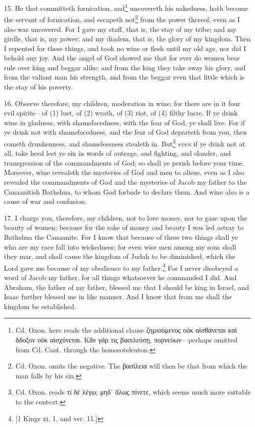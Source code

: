 15. He that committeth fornication, and\footnote{Cd. Oxon. here reads the additional clause \textgreek{ζημιούμενος οὐκ αἰσθάνεται καὶ ἄδοξον οὐκ αἰσχύνεται. Κἂν γάρ τις βασιλεύσῃ, πορνεύων}—perhaps omitted from Cd. Cant. through the homœoteleuton.} uncovereth his nakedness, hath become the servant of fornication, and escapeth not\footnote{Cd. Oxon. omits the negative. The \textgreek{βασίλεια} will then be that from which the man falls by his sin.} from the power thereof, even as I also was uncovered. For I gave my staff, that is, the stay of my tribe; and my girdle, that is, my power; and my diadem, that is, the glory of my kingdom. Then I repented for these things, and took no wine or flesh until my old age, nor did I behold any joy. And the angel of God showed me that for ever do women bear rule over king and beggar alike; and from the king they take away his glory, and from the valiant man his strength, and from the beggar even that little which is the stay of his poverty.

16. Observe therefore, my children, moderation in wine; for there are in it four evil spirits—of (1) lust, of (2) wrath, of (3) riot, of (4) filthy lucre. If ye drink wine in gladness, with shamefacedness, with the fear of God, ye shall live. For if ye drink not with shamefacedness, and the fear of God departeth from you, then cometh drunkenness, and shamelessness stealeth in. But\footnote{Cd. Oxon. reads \textgreek{τί δὲ λέγω}; \textgreek{μηδ᾽ ὅλως πίνετε}, which seems much more suitable to the context.} \emph{even} if ye drink not at all, take heed lest ye sin in words of outrage, and fighting, and slander, and transgression of the commandments of God; so shall ye perish before your time. Moreover, wine revealeth the mysteries of God and men to aliens, even as I also revealed the commandments of God and the mysteries of Jacob my father to the Canaanitish Bathshua, to whom God forbade to declare them. And wine also is a cause of war and confusion.

17. I charge you, therefore, my children, not to love money, nor to gaze upon the beauty of women; because for the sake of money and beauty I was led astray to Bathshua the Canaanite. For I know that because of these two things shall ye who are my race fall into wickedness; for even wise men among my sons shall they mar, and shall cause the kingdom of Judah to be diminished, which the Lord gave me because of my obedience to my father.\footnote{[1 Kings xi. 1, and ver. 11.]} For I never disobeyed a word of Jacob my father, for all things whatsoever he commanded I did. And Abraham, the father of my father, blessed me that I should be king in Israel, and Isaac further blessed me in like manner. And I know that from me shall the kingdom be established.

